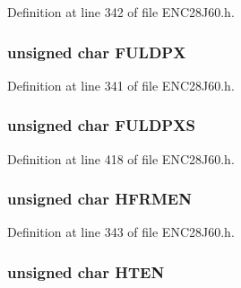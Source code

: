 Definition at line 342 of file E\+N\+C28\+J60.\+h.

\hypertarget{union___r_e_g_ad13990088d6e09414d75112ab6cafa34}{}
\subsubsection[{F\+U\+L\+D\+P\+X}]{\setlength{\rightskip}{0pt plus 5cm}unsigned {\bf char} F\+U\+L\+D\+P\+X}\label{union___r_e_g_ad13990088d6e09414d75112ab6cafa34}


Definition at line 341 of file E\+N\+C28\+J60.\+h.

\hypertarget{union___r_e_g_a7c4278678dc4cf95998b60faa33638f2}{}
\subsubsection[{F\+U\+L\+D\+P\+X\+S}]{\setlength{\rightskip}{0pt plus 5cm}unsigned {\bf char} F\+U\+L\+D\+P\+X\+S}\label{union___r_e_g_a7c4278678dc4cf95998b60faa33638f2}


Definition at line 418 of file E\+N\+C28\+J60.\+h.

\hypertarget{union___r_e_g_aac54dd45aee666aaefd4cbe312dd41ef}{}
\subsubsection[{H\+F\+R\+M\+E\+N}]{\setlength{\rightskip}{0pt plus 5cm}unsigned {\bf char} H\+F\+R\+M\+E\+N}\label{union___r_e_g_aac54dd45aee666aaefd4cbe312dd41ef}


Definition at line 343 of file E\+N\+C28\+J60.\+h.

\hypertarget{union___r_e_g_a4db57cba7d1b49bb23020b788e40e3f0}{}
\subsubsection[{H\+T\+E\+N}]{\setlength{\rightskip}{0pt plus 5cm}unsigned {\bf char} H\+T\+E\+N}\label{union___r_e_g_a4db57cba7d1b49bb23020b788e40e3f0}


